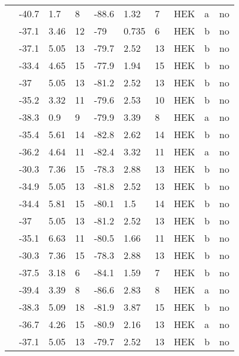\begin{longtable}{p{6cm}|lll|lll|lll}
\citet{Kapplinger2015MutationDB} & -40.7 & 1.7 & 8 & -88.6 & 1.32 & 7 & HEK & a & no \\
\citet{Kapplinger2015MutationDB} & -37.1 & 3.46 & 12 & -79 & 0.735 & 6 & HEK & b & no \\
\citet{Kapplinger2015MutationDB} & -37.1 & 5.05 & 13 & -79.7 & 2.52 & 13 & HEK & b & no \\
\citet{Kapplinger2015MutationDB} & -33.4 & 4.65 & 15 & -77.9 & 1.94 & 15 & HEK & b & no \\
\citet{Kapplinger2015MutationDB} & -37 & 5.05 & 13 & -81.2 & 2.52 & 13 & HEK & b & no \\
\citet{Kapplinger2015MutationDB} & -35.2 & 3.32 & 11 & -79.6 & 2.53 & 10 & HEK & b & no \\
\citet{Kapplinger2015MutationDB} & -38.3 & 0.9 & 9 & -79.9 & 3.39 & 8 & HEK & a & no \\
\citet{Kapplinger2015MutationDB} & -35.4 & 5.61 & 14 & -82.8 & 2.62 & 14 & HEK & b & no \\
\citet{Kapplinger2015MutationDB} & -36.2 & 4.64 & 11 & -82.4 & 3.32 & 11 & HEK & a & no \\
\citet{Kapplinger2015MutationDB} & -30.3 & 7.36 & 15 & -78.3 & 2.88 & 13 & HEK & b & no \\
\citet{Kapplinger2015MutationDB} & -34.9 & 5.05 & 13 & -81.8 & 2.52 & 13 & HEK & b & no \\
\citet{Kapplinger2015MutationDB} & -34.4 & 5.81 & 15 & -80.1 & 1.5 & 14 & HEK & b & no \\
\citet{Kapplinger2015MutationDB} & -37 & 5.05 & 13 & -81.2 & 2.52 & 13 & HEK & b & no \\
\citet{Kapplinger2015MutationDB} & -35.1 & 6.63 & 11 & -80.5 & 1.66 & 11 & HEK & b & no \\
\citet{Kapplinger2015MutationDB} & -30.3 & 7.36 & 15 & -78.3 & 2.88 & 13 & HEK & b & no \\
\citet{Kapplinger2015MutationDB} & -37.5 & 3.18 & 6 & -84.1 & 1.59 & 7 & HEK & b & no \\
\citet{Kapplinger2015MutationDB} & -39.4 & 3.39 & 8 & -86.6 & 2.83 & 8 & HEK & a & no \\
\citet{Kapplinger2015MutationDB} & -38.3 & 5.09 & 18 & -81.9 & 3.87 & 15 & HEK & b & no \\
\citet{Kapplinger2015MutationDB} & -36.7 & 4.26 & 15 & -80.9 & 2.16 & 13 & HEK & a & no \\
\citet{Kapplinger2015MutationDB} & -37.1 & 5.05 & 13 & -79.7 & 2.52 & 13 & HEK & b & no \\

\end{longtable}
